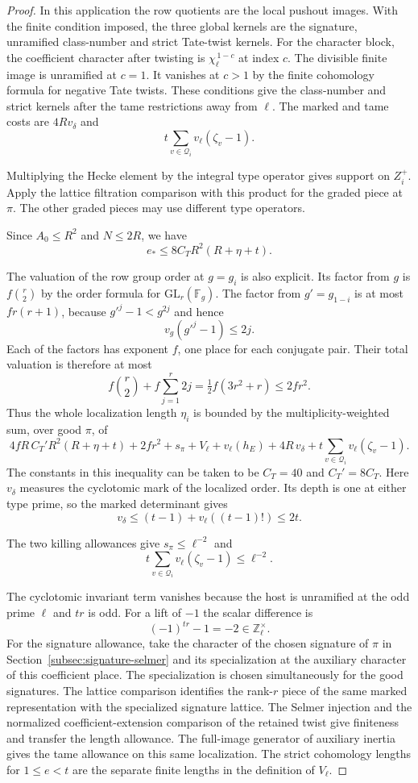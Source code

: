 \begin{proof}
In this application the row
quotients are the local pushout images. With the
finite condition imposed, the three global kernels
are the signature, unramified class-number and
strict Tate-twist kernels. For the character block,
the coefficient character after twisting is
\(\chi_\ell^{\,1-c}\) at index \(c\).
The divisible finite image is unramified at \(c=1\).
It vanishes at \(c>1\) by the finite cohomology
formula for negative Tate twists. These conditions
give the class-number and strict kernels after
the tame restrictions away from \(\ell\).
The marked and tame costs
are \(4R v_\delta\) and
\[
 t\sum_{v\in\mathcal Q_i}v_\ell(\zeta_v-1).
\]

Multiplying the Hecke element by the integral
type operator gives support on \(Z_i^+\).
Apply the lattice filtration comparison with this
product for the graded piece at \(\pi\).
The other graded pieces may use different type
operators.

Since \(A_0\le R^2\) and \(N\le2R\), we have
\[
 e_*\le8C_TR^2(R+\eta+t).
\]

The valuation of the row group order at \(g=g_i\)
is also explicit. Its factor from \(g\) is
\(f\binom r2\) by the order formula for
\(\mathrm{GL}_r(\mathbb F_g)\). The factor from
\(g'=g_{1-i}\) is at most \(fr(r+1)\), because
\(g'^j-1<g^{2j}\) and hence
\[
 v_g(g'^j-1)\le2j.
\]
Each of the factors has
exponent \(f\), one place for each conjugate pair.
Their total valuation is therefore at most
\[
 f\binom r2+f\sum_{j=1}^r2j=\tfrac12 f(3r^2+r)\le2fr^2 .
\] Thus the whole
localization length \(\eta_i\) is bounded by the
multiplicity-weighted sum, over good \(\pi\), of
\[
 4fR\,C_T'R^2(R+\eta+t)+2fr^2
   +s_\pi+V_\ell+v_\ell(h_E)+4R\,v_\delta
   +t\sum_{v\in\mathcal Q_i}v_\ell(\zeta_v-1).
 \tag{T}\label{eq:local-prime-t}
\]
The constants in this inequality can be
taken to be \(C_T=40\) and \(C_T'=8C_T\).
Here \(v_\delta\) measures the cyclotomic mark of the
localized order. Its depth is one at either type
prime, so the marked determinant gives
\[
 v_\delta\le(t-1)+v_\ell((t-1)!)\le2t.
\]

The two killing allowances give
\(s_\pi\le\ell^{-2}\) and
\[
 t\sum_{v\in\mathcal Q_i}v_\ell(\zeta_v-1)\le\ell^{-2}.
\]

The cyclotomic invariant term vanishes because the
host is unramified at the odd prime \(\ell\) and \(tr\) is odd.
For a lift of \(-1\) the scalar difference is
\[
 (-1)^{tr}-1=-2\in\mathbb Z_\ell^\times .
\] For the signature
allowance, take the character of the chosen signature of
\(\pi\) in Section~\ref{subsec:signature-selmer} and its
specialization at the auxiliary character of this coefficient
place. The specialization is chosen simultaneously for the
good signatures. The lattice comparison identifies the
rank-\(r\) piece of the same marked representation with the
specialized signature lattice. The Selmer injection and the
normalized coefficient-extension comparison of the retained
twist give finiteness and transfer the length allowance.
The full-image generator of auxiliary inertia gives the
tame allowance on this same localization. The strict
cohomology lengths for \(1\le e<t\) are the separate
finite lengths in the definition of \(V_\ell\).


\end{proof}
